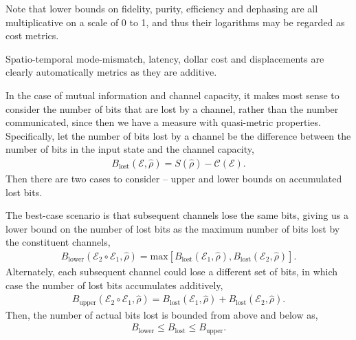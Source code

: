 Note that lower bounds on fidelity, purity, efficiency and dephasing are all multiplicative on a scale of 0 to 1, and thus their logarithms may be regarded as cost metrics.

Spatio-temporal mode-mismatch, latency, dollar cost and displacements are clearly automatically metrics as they are additive.

In the case of mutual information and channel capacity, it makes most sense to consider the number of bits that are lost by a channel, rather than the number communicated, since then we have a measure with quasi-metric properties. Specifically, let the number of bits lost by a channel be the difference between the number of bits in the input state and the channel capacity,
\begin{align}
B_\text{lost}(\mathcal{E},\hat\rho) = S(\hat\rho) - \mathcal{C}(\mathcal{E}).
\end{align}
Then there are two cases to consider -- upper and lower bounds on accumulated lost bits.

The best-case scenario is that subsequent channels lose the same bits, giving us a lower bound on the number of lost bits as the maximum number of bits lost by the constituent channels,
\begin{align}
B_\text{lower}(\mathcal{E}_2\circ\mathcal{E}_1,\hat\rho) = \text{max}[B_\text{lost}(\mathcal{E}_1,\hat\rho), B_\text{lost}(\mathcal{E}_2,\hat\rho)].
\end{align}
Alternately, each subsequent channel could lose a different set of bits, in which case the number of lost bits accumulates additively,
\begin{align}
B_\text{upper}(\mathcal{E}_2\circ\mathcal{E}_1,\hat\rho) = B_\text{lost}(\mathcal{E}_1,\hat\rho) + B_\text{lost}(\mathcal{E}_2,\hat\rho). 
\end{align}
Then, the number of actual bits lost is bounded from above and below as,
\begin{align}
B_\text{lower} \leq B_\text{lost} \leq B_\text{upper}.	
\end{align}


